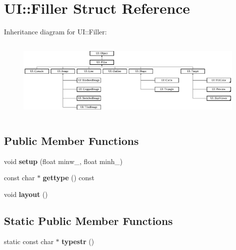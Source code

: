 \hypertarget{struct_u_i_1_1_filler}{}\section{UI\+:\+:Filler Struct Reference}
\label{struct_u_i_1_1_filler}
Inheritance diagram for UI\+:\+:Filler\+:\begin{figure}[H]
\begin{center}
\leavevmode
\includegraphics[height=3.951613cm]{struct_u_i_1_1_filler}
\end{center}
\end{figure}
\subsection*{Public Member Functions}
\begin{DoxyCompactItemize}
\item 
\mbox{\label{struct_u_i_1_1_filler_a10fe0c7cb16fca977e060ac05fa2b0a9}} 
void {\bfseries setup} (float minw\+\_\+, float minh\+\_\+)
\item 
\mbox{\label{struct_u_i_1_1_filler_ac1e0b66287630c428e64a83fb04a19b4}} 
const char $\ast$ {\bfseries gettype} () const
\item 
\mbox{\label{struct_u_i_1_1_filler_a6c7e90fe8c7aa157cbc2a5fe02dc1f1c}} 
void {\bfseries layout} ()
\end{DoxyCompactItemize}
\subsection*{Static Public Member Functions}
\begin{DoxyCompactItemize}
\item 
\mbox{\label{struct_u_i_1_1_filler_ac50b83a251dfb07f284bc599337b6963}} 
static const char $\ast$ {\bfseries typestr} ()
\end{DoxyCompactItemize}
